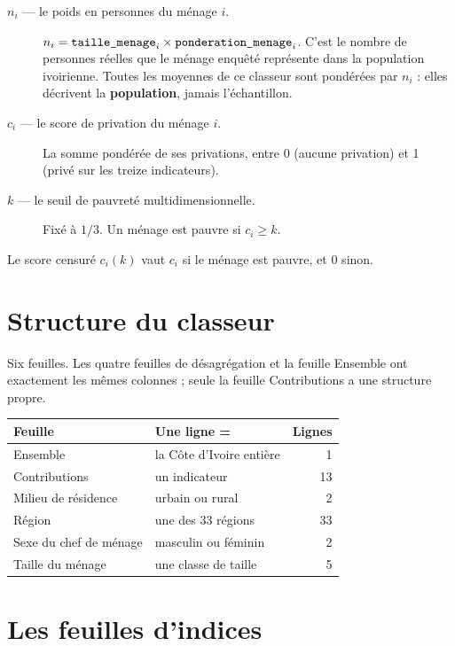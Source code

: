 \documentclass[11pt,a4paper]{article}
\begin{document}
\begin{description}
  \item[$n_i$ --- le poids en personnes du ménage $i$.] $n_i = \texttt{taille\_menage}_i \times
  \texttt{ponderation\_menage}_i$. C'est le nombre de personnes réelles que le ménage enquêté
  représente dans la population ivoirienne. Toutes les moyennes de ce classeur sont pondérées par
  $n_i$ : elles décrivent la \textbf{population}, jamais l'échantillon.

  \item[$c_i$ --- le score de privation du ménage $i$.] La somme pondérée de ses privations,
  entre 0 (aucune privation) et 1 (privé sur les treize indicateurs).

  \item[$k$ --- le seuil de pauvreté multidimensionnelle.] Fixé à $1/3$. Un ménage est pauvre si
  $c_i \ge k$.
\end{description}

Le score censuré $c_i(k)$ vaut $c_i$ si le ménage est pauvre, et $0$ sinon.

\section{Structure du classeur}

Six feuilles. Les quatre feuilles de désagrégation et la feuille \textsf{Ensemble} ont exactement
les mêmes colonnes ; seule la feuille \textsf{Contributions} a une structure propre.

\begin{center}
\begin{tabular}{@{}llr@{}}
\toprule
\textbf{Feuille} & \textbf{Une ligne =} & \textbf{Lignes} \\
\midrule
\textsf{Ensemble} & la Côte d'Ivoire entière & 1 \\
\textsf{Contributions} & un indicateur & 13 \\
\textsf{Milieu de résidence} & urbain ou rural & 2 \\
\textsf{Région} & une des 33 régions & 33 \\
\textsf{Sexe du chef de ménage} & masculin ou féminin & 2 \\
\textsf{Taille du ménage} & une classe de taille & 5 \\
\bottomrule
\end{tabular}
\end{center}

\section{Les feuilles d'indices}
\end{document}
